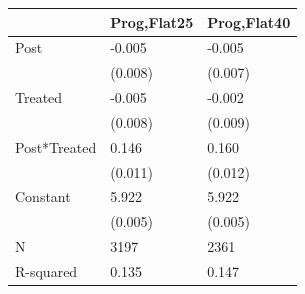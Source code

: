 \begin{tabular}{lll}
\toprule
 & Prog,Flat25 & Prog,Flat40 \\
\midrule
Post & -0.005 & -0.005 \\
 & (0.008) & (0.007) \\
Treated & -0.005 & -0.002 \\
 & (0.008) & (0.009) \\
Post*Treated & 0.146 & 0.160 \\
 & (0.011) & (0.012) \\
Constant & 5.922 & 5.922 \\
 & (0.005) & (0.005) \\
N & 3197 & 2361 \\
R-squared & 0.135 & 0.147 \\
\bottomrule
\end{tabular}
